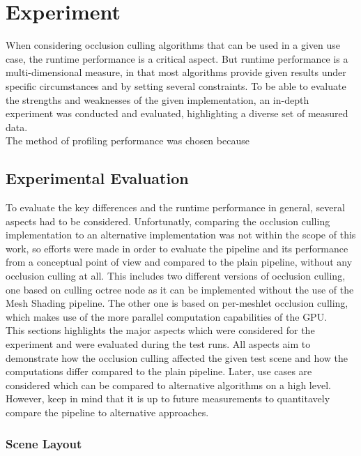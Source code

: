 \chapter{Experiment} \label{cpt-experiment}

When considering occlusion culling algorithms that can be used in a given use case, the runtime 
performance is a critical aspect. But runtime performance is a multi-dimensional measure, in that 
most algorithms provide given results under specific circumstances and by setting several constraints.
To be able to evaluate the strengths and weaknesses of the given implementation, an in-depth  
experiment was conducted and evaluated, highlighting a diverse set of measured data. \\ 

\noindent
The method of profiling performance was chosen because 

\section{Experimental Evaluation} \label{sec-experimental-evaluation}

To evaluate the key differences and the runtime performance in general, several aspects had to be considered.
Unfortunatly, comparing the occlusion culling implementation to an alternative implementation was not within the 
scope of this work, so efforts were made in order to evaluate the pipeline and its performance from a conceptual 
point of view and compared to the plain pipeline, without any occlusion culling at all. This includes two different 
versions of occlusion culling, one based on culling octree node as it can be implemented without the use of the 
Mesh Shading pipeline. The other one is based on per-meshlet occlusion culling, which makes use of the more parallel 
computation capabilities of the \ac{GPU}. \\

\noindent
This sections highlights the major aspects which were considered for the experiment and were evaluated during the 
test runs. All aspects aim to demonstrate how the occlusion culling affected the given test scene and how the 
computations differ compared to the plain pipeline. Later, use cases are considered which can be compared to 
alternative algorithms on a high level. However, keep in mind that it is up to future measurements to quantitavely 
compare the pipeline to alternative approaches. 


\subsection*{Scene Layout} \label{subsec-scene-layout}

